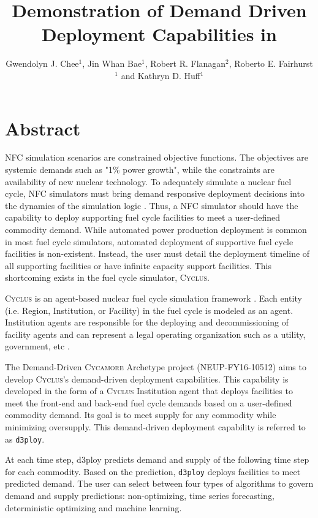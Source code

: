 \documentclass{anstrans}
\title{Demonstration of Demand Driven Deployment Capabilities in \Cyclus}
\author{Gwendolyn J. Chee$^1$, Jin Whan Bae$^1$, Robert R. Flanagan$^2$, Roberto E. Fairhurst$^1$ and Kathryn D. Huff$^1$}
\institute{
$^1$Dept. of Nuclear, Plasma and Radiological Engineering, University of Illinois at Urbana-Champaign \\
$^2$Nuclear Engineering Program, University of South Carolina \\

gchee2@illinois.edu
}
\newcommand{\Cyclus}{\textsc{Cyclus}\xspace}%
\newcommand{\Cycamore}{\textsc{Cycamore}\xspace}%
\begin{document}
\section{Abstract}
\gls{NFC} simulation scenarios are constrained objective functions. 
The objectives are systemic demands such as "1\% power growth", while the 
constraints are availability of new nuclear technology. 
To adequately simulate a nuclear fuel cycle, \gls{NFC} simulators 
must bring demand responsive deployment decisions into the dynamics of the 
simulation logic \cite{huff_current_2017}. 
Thus, a \gls{NFC} simulator should have the capability to deploy 
supporting fuel cycle facilities to meet a user-defined commodity demand. 
While automated power production deployment is common in most fuel cycle 
simulators, automated deployment of supportive fuel cycle 
facilities is non-existent. 
Instead, the user must detail the deployment timeline of all supporting 
facilities or have infinite capacity support facilities. This shortcoming 
exists in the fuel cycle simulator, \Cyclus. 

\Cyclus is an agent-based nuclear fuel cycle simulation framework 
\cite{huff_fundamental_2016}. 
Each entity (i.e. Region, Institution, or Facility) in the fuel cycle is modeled 
as an agent. 
Institution agents
are responsible for the deploying and decommissioning of facility agents and
can represent a legal operating organization such as a 
utility, government, etc \cite{huff_fundamental_2016}. 

The Demand-Driven \Cycamore Archetype project (NEUP-FY16-10512) aims to 
develop \Cyclus's demand-driven deployment capabilities. 
This capability is developed in the form of a \Cyclus Institution agent that 
deploys facilities to meet the front-end and back-end fuel cycle demands
based on a user-defined commodity demand. 
Its goal is to meet supply for any commodity while minimizing oversupply.
This demand-driven deployment capability is referred to as \texttt{d3ploy}. 

At each time step, d3ploy predicts demand and supply of the following time step 
for each commodity.
Based on the prediction, \texttt{d3ploy} deploys facilities to 
meet predicted demand. 
The user can select between four types of algorithms to govern demand and supply 
predictions: 
non-optimizing, time series forecasting, deterministic optimizing and machine 
learning. 
\end{document}
